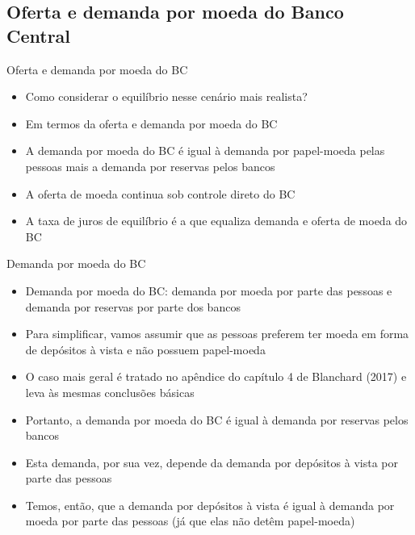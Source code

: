 \documentclass[10pt]{beamer}
\begin{document}
\subsection{Oferta e demanda por moeda do Banco Central}
\begin{frame}{Oferta e demanda por moeda do BC}
    \begin{itemize}
        \item Como considerar o equilíbrio nesse cenário mais realista?
        \bigskip
        \item Em termos da oferta e demanda por moeda do BC
        \bigskip
        \item A demanda por moeda do BC é igual à demanda por papel-moeda pelas pessoas mais a demanda por reservas pelos bancos
        \bigskip
        \item A oferta de moeda continua sob controle direto do BC
        \bigskip
        \item A taxa de juros de equilíbrio é a que equaliza demanda e oferta de moeda do BC
    \end{itemize}
\end{frame}

\begin{frame}{Demanda por moeda do BC}
    \begin{itemize}
        \item Demanda por moeda do BC: demanda por moeda por parte das pessoas e demanda por reservas por parte dos bancos
        \bigskip
        \item Para simplificar, vamos assumir que as pessoas preferem ter moeda em forma de depósitos à vista e não possuem papel-moeda
        \bigskip
        \item O caso mais geral é tratado no apêndice do capítulo 4 de Blanchard (2017) e leva às mesmas conclusões básicas
        \bigskip
        \item Portanto,  a demanda por moeda do BC é igual à demanda por reservas pelos bancos
        \bigskip
        \item Esta demanda, por sua vez, depende da demanda por depósitos à vista por parte das pessoas
        \bigskip
        \item Temos, então, que a demanda por depósitos à vista é igual à demanda por moeda por parte das pessoas (já que elas não detêm papel-moeda)
    \end{itemize}
\end{frame}
\end{document}
